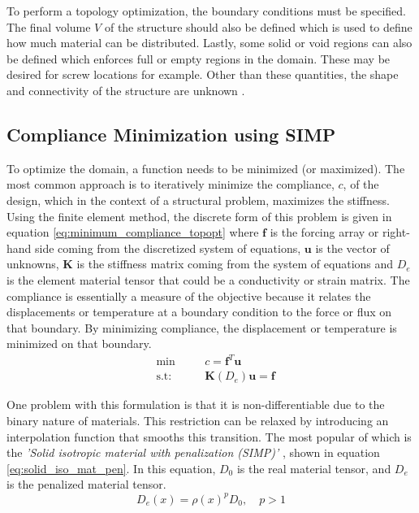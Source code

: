 To perform a topology optimization, the boundary conditions must be specified. The final volume $V$ of the structure should also be defined which is used to define how much material can be distributed. Lastly, some solid or void regions can also be defined which enforces full or empty regions in the domain. These may be desired for screw locations for example. Other than these quantities, the shape and connectivity of the structure are unknown \cite{Bendsøe_2004}.

\subsection*{Compliance Minimization using SIMP}
To optimize the domain, a function needs to be minimized (or maximized). The most common approach is to iteratively minimize the compliance, $c$, of the design, which in the context of a structural problem, maximizes the stiffness. Using the finite element method, the discrete form of this problem is given in equation \ref{eq:minimum_compliance_topopt} \cite{Bendsøe_2004} where $\mathbf{f}$ is the forcing array or right-hand side coming from the discretized system of equations, $\mathbf{u}$ is the vector of unknowns, $\mathbf{K}$ is the stiffness matrix coming from the system of equations and $D_e$ is the element material tensor that could be a conductivity or strain matrix. The compliance is essentially a measure of the objective because it relates the displacements or temperature at a boundary condition to the force or flux on that boundary. By minimizing compliance, the displacement or temperature is minimized on that boundary.
\begin{equation}
    \begin{alignedat}{2}
        &\min  \quad && c = \mathbf{f}^T \mathbf{u} \\
        &\text{s.t:} && \mathbf{K}(D_e)\mathbf{u}=\mathbf{f}
    \end{alignedat}
    \label{eq:minimum_compliance_topopt}
\end{equation}

One problem with this formulation is that it is non-differentiable due to the binary nature of materials. This restriction can be relaxed by introducing an interpolation function that smooths this transition. The most popular of which is the \emph{'Solid isotropic material with penalization (SIMP)'} \cite{Bendsøe_2004}, shown in equation \ref{eq:solid_iso_mat_pen}. In this equation, $D_0$ is the real material tensor, and $D_e$ is the penalized material tensor.
\begin{equation}
    D_e(x) = \rho(x)^p D_0, \quad p > 1
    \label{eq:solid_iso_mat_pen}
\end{equation}


